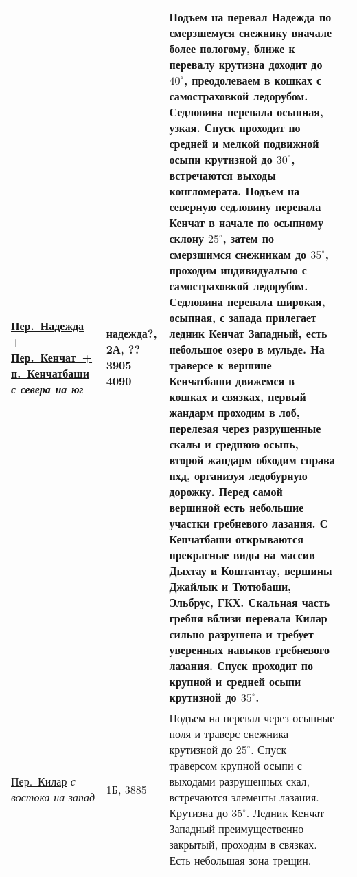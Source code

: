 \begin{longtable}{|>{\centering\arraybackslash}m{4.5cm}|>{\centering\arraybackslash}m{1.8cm}|>{\raggedright\arraybackslash}m{9.6cm}|>{\centering\arraybackslash}m{1.2cm}|}
			\hyperref[subsec:main_obstacles]{{\small Пер.~Надежда + Пер.~Кенчат~+ п.~Кенчатбаши}}									\newline\textit{с севера на юг}			&	надежда?, 2А, ?? 3905 4090	&	{\small Подъем на перевал Надежда по смерзшемуся снежнику вначале более пологому, ближе к перевалу крутизна доходит до $40^\circ$, преодолеваем в кошках с самостраховкой ледорубом. Седловина перевала осыпная, узкая. Спуск проходит по средней и мелкой подвижной осыпи крутизной до $30^\circ$, встречаются выходы конгломерата. Подъем на северную седловину перевала Кенчат в начале по осыпному склону $25^\circ$, затем по смерзшимся снежникам до $35^\circ$, проходим индивидуально с самостраховкой ледорубом. Седловина перевала широкая, осыпная, с запада прилегает ледник Кенчат Западный, есть небольшое озеро в мульде. На траверсе к вершине Кенчатбаши движемся в кошках и связках, первый жандарм проходим в лоб, перелезая через разрушенные скалы и среднюю осыпь, второй жандарм обходим справа пхд, организуя ледобурную дорожку. Перед самой вершиной есть небольшие участки гребневого лазания. С Кенчатбаши открываются прекрасные виды на массив Дыхтау и Коштантау, вершины Джайлык и Тютюбаши, Эльбрус, ГКХ. Скальная часть гребня вблизи перевала Килар сильно разрушена и требует уверенных навыков гребневого лазания. Спуск проходит по крупной и средней осыпи крутизной до $35^\circ$.}																																										&			\\ \hline
			\hyperref[subsec:main_obstacles]{{\small Пер.~Килар}}																	\newline\textit{с востока на запад}		&	1Б, 3885					&	{\small Подъем на перевал через осыпные поля и траверс снежника крутизной до $25^\circ$. Спуск траверсом крупной осыпи с выходами разрушенных скал, встречаются элементы лазания. Крутизна до $35^\circ$. Ледник Кенчат Западный преимущественно закрытый, проходим в связках. Есть небольшая зона трещин.}																																																																																																																																																																																																																																																																						&			\\ \hline

\end{longtable}
